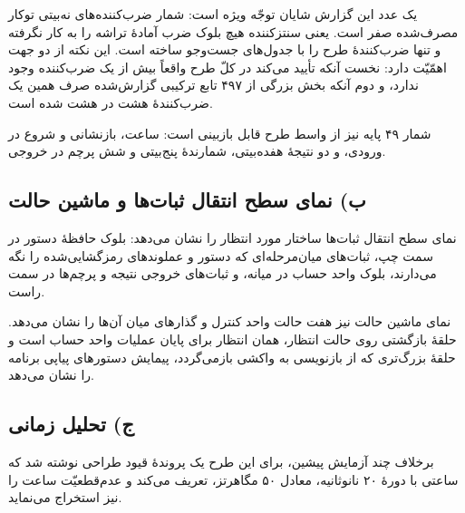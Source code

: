 \documentclass[12pt,a4paper]{article}
\begin{document}

	یک عدد این گزارش شایان توجّه ویژه است: شمار ضرب‌کننده‌های نه‌بیتی توکار مصرف‌شده صفر است. یعنی سنتز‌کننده هیچ بلوک ضرب آمادهٔ تراشه را به کار نگرفته و تنها ضرب‌کنندهٔ طرح را با جدول‌های جست‌وجو ساخته است. این نکته از دو جهت اهمّیّت دارد: نخست آنکه تأیید می‌کند در کلّ طرح واقعاً بیش از یک ضرب‌کننده وجود ندارد، و دوم آنکه بخش بزرگی از ۴۹۷ تابع ترکیبی گزارش‌شده صرف همین یک ضرب‌کنندهٔ هشت در هشت شده است.

	شمار ۴۹ پایه نیز از واسط طرح قابل بازبینی است: ساعت، بازنشانی و شروع در ورودی، و دو نتیجهٔ هفده‌بیتی، شمارندهٔ پنج‌بیتی و شش پرچم در خروجی.

	\subsection*{ب) نمای سطح انتقال ثبات‌ها و ماشین حالت}
	نمای سطح انتقال ثبات‌ها ساختار مورد انتظار را نشان می‌دهد: بلوک حافظهٔ دستور در سمت چپ، ثبات‌های میان‌مرحله‌ای که دستور و عملوندهای رمزگشایی‌شده را نگه می‌دارند، بلوک واحد حساب در میانه، و ثبات‌های خروجی نتیجه و پرچم‌ها در سمت راست.


	نمای ماشین حالت نیز هفت حالت واحد کنترل و گذارهای میان آن‌ها را نشان می‌دهد. حلقهٔ بازگشتی روی حالت انتظار، همان انتظار برای پایان عملیات واحد حساب است و حلقهٔ بزرگ‌تری که از بازنویسی به واکشی بازمی‌گردد، پیمایش دستورهای پیاپی برنامه را نشان می‌دهد.



	\subsection*{ج) تحلیل زمانی}
	برخلاف چند آزمایش پیشین، برای این طرح یک پروندهٔ قیود طراحی نوشته شد که ساعتی با دورهٔ ۲۰ نانوثانیه، معادل ۵۰ مگاهرتز، تعریف می‌کند و عدم‌قطعیّت ساعت را نیز استخراج می‌نماید.

\end{document}
